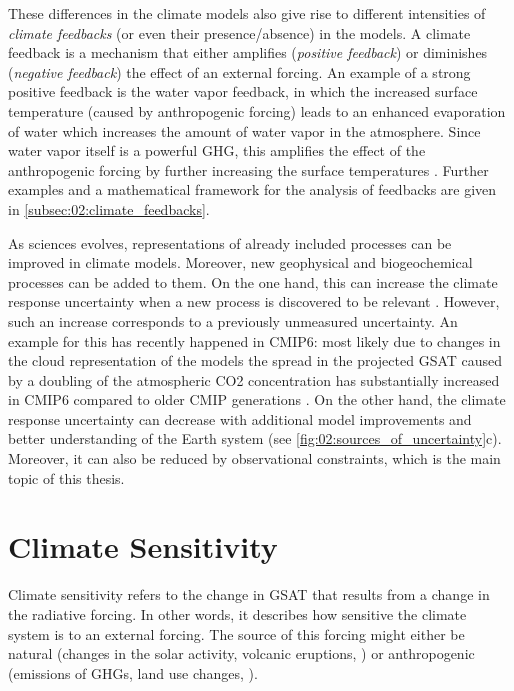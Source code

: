 These differences in the climate models also give rise to different intensities
of \emph{climate feedbacks} (or even their presence/absence) in the models. A
climate feedback is a mechanism that either amplifies (\emph{positive
  feedback}) or diminishes (\emph{negative feedback}) the effect of an external
forcing. An example of a strong positive feedback is the water vapor feedback,
in which the increased surface temperature (caused by anthropogenic forcing)
leads to an enhanced evaporation of water which increases the amount of water
vapor in the atmosphere. Since water vapor itself is a powerful \ac{GHG}, this
amplifies the effect of the anthropogenic forcing by further increasing the
surface temperatures \autocite{Cubasch2013}. Further examples and a
mathematical framework for the analysis of feedbacks are given in
\cref{subsec:02:climate_feedbacks}.

As sciences evolves, representations of already included processes can be
improved in climate models. Moreover, new geophysical and biogeochemical
processes can be added to them. On the one hand, this can increase the climate
response uncertainty when a new process is discovered to be relevant
. However,
such an increase corresponds to a previously unmeasured uncertainty. An example
for this has recently happened in \acs{CMIP}6: most likely due to changes in
the cloud representation of the models the spread in the projected \ac{GSAT}
caused by a doubling of the atmospheric \ac{CO2} concentration has
substantially increased in \acs{CMIP}6 compared to older \ac{CMIP} generations
\autocite{Zelinka2020}. On the other hand, the climate response uncertainty can
decrease with additional model improvements and better understanding of the
Earth system (see \cref{fig:02:sources_of_uncertainty}c). Moreover, it can also
be reduced by observational constraints, which is the main topic of this
thesis.


\section{Climate Sensitivity}
\label{sec:02:climate_sensitivity}

Climate sensitivity refers to the change in \ac{GSAT} that results from a
change in the radiative forcing. In other words, it describes how sensitive the
climate system is to an external forcing. The source of this forcing might
either be natural (changes in the solar activity, volcanic eruptions, \etc{})
or anthropogenic (emissions of \acp{GHG}, land use changes, \etc{}).


